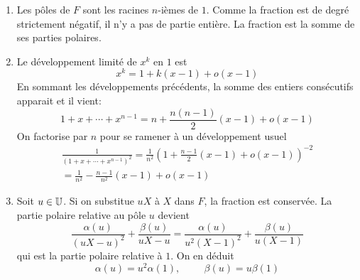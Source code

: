 \begin{enumerate}
 \item Les pôles de $F$ sont les racines $n$-ièmes de $1$. Comme la fraction est de degré strictement négatif, il n'y a pas de partie entière. La fraction est la somme de ses parties polaires.
 \item Le développement limité de $x^k$ en $1$ est
\begin{displaymath}
 x^k = 1 +k(x-1) + o(x-1)
\end{displaymath}
En sommant les développements précédents, la somme des entiers consécutifs apparait et il vient:
\begin{displaymath}
 1+x+\cdots +x^{n-1} = n +\frac{n(n-1)}{2}(x-1)+o(x-1)
\end{displaymath}
On factorise par $n$ pour se ramener à un développement usuel
\begin{multline*}
 \frac{1}{(1+x+\cdots +x^{n-1})^2}=\frac{1}{n^2}\left(1+\frac{n-1}{2}(x-1)+o(x-1) \right)^{-2}\\
=\frac{1}{n^2} -\frac{n-1}{n^2}(x-1)+o(x-1) 
\end{multline*}

 \item Soit $u\in\mathbb{U}$. Si on substitue $uX$ à $X$ dans $F$, la fraction est conservée. La partie polaire relative au pôle $u$ devient
\begin{displaymath}
 \frac{\alpha(u)}{(uX-u)^2}+\frac{\beta(u)}{uX-u}=
\frac{\alpha(u)}{u^2(X-1)^2}+\frac{\beta(u)}{u(X-1)}
\end{displaymath}
qui est la partie polaire relative à $1$. On en déduit
\begin{displaymath}
 \alpha(u) = u^2\alpha(1),\hspace{1cm} \beta(u)=u\beta(1)
\end{displaymath}


\end{enumerate}

